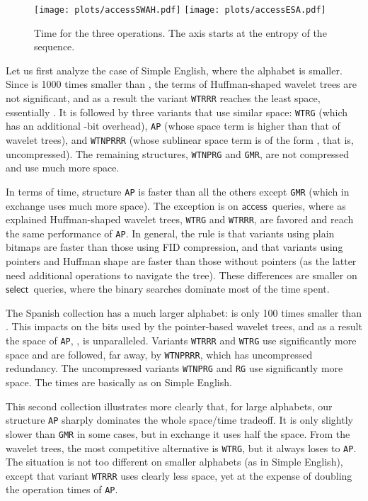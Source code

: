 \documentclass[11pt]{article}
\newcommand{\access}
    {\ensuremath{\mathsf{access}}}
\newcommand{\select}
    {\ensuremath{\mathsf{select}}}
\begin{document}
\begin{table}[t]
{\begin{tabular}
\begin{figure}
\centerline{\texttt{[image: plots/accessSWAH.pdf]}
\texttt{[image: plots/accessESA.pdf]}}

\caption{Time for the three operations. The  axis starts at the entropy of the sequence.}
\label{fig:opers}
\end{figure}

Let us first analyze the case of Simple English, where the alphabet is
smaller. Since  is 1000 times smaller than , the 
 terms of Huffman-shaped wavelet trees are not significant,
and as a result the variant \texttt{WTRRR} reaches the least space,
essentially . It is followed by three variants that use
similar space: \texttt{WTRG} (which has an additional -bit overhead),
\texttt{AP} (whose  space term is higher than that of wavelet
trees), and \texttt{WTNPRRR} (whose sublinear space term is of the form
, that is, uncompressed). The remaining structures,
\texttt{WTNPRG} and \texttt{GMR}, are not compressed and use much more space.


In terms of time, structure \texttt{AP} is faster than all the others
except \texttt{GMR} (which in exchange uses much more space). The exception
is on \access\ queries, where as explained Huffman-shaped wavelet trees,
\texttt{WTRG} and \texttt{WTRRR}, are favored and reach the same performance
of \texttt{AP}. In general, the rule is that variants using plain bitmaps are
faster than those using FID compression, and that variants using pointers
and Huffman shape are faster than those without pointers (as the latter need
additional operations to navigate the tree). These differences are smaller on
\select\ queries, where the binary searches dominate most of the time spent.

The Spanish collection has a much larger alphabet:  is only 100 times
smaller than . This impacts on the  bits used by the
pointer-based wavelet trees, and as a result the space of \texttt{AP},
, is unparalleled. Variants \texttt{WTRRR} and
\texttt{WTRG} use significantly more space and are followed, far away,
by \texttt{WTNPRRR}, which has uncompressed redundancy. The
uncompressed variants \texttt{WTNPRG} and \texttt{RG} use significantly more
space. The times are basically as on Simple English.

This second collection illustrates more clearly that, for large alphabets,
our structure \texttt{AP} sharply dominates the whole space/time tradeoff.
It is only slightly slower than \texttt{GMR} in some cases, but in exchange
it uses half the space. From the wavelet trees, the most competitive alternative
is \texttt{WTRG}, but it always loses to \texttt{AP}. The situation is not too
different on smaller alphabets (as in Simple English), except that variant
\texttt{WTRRR} uses clearly less space, yet at the expense of doubling
the operation times of \texttt{AP}.


\end{tabular}}
\end{table}
\end{document}
